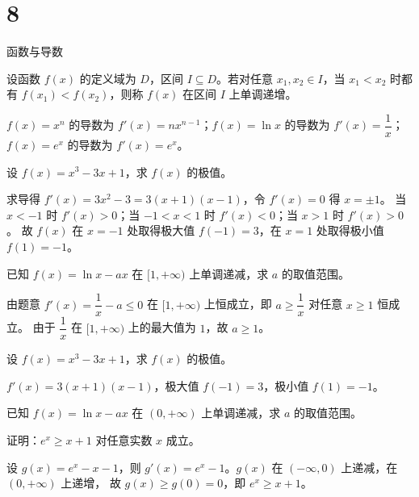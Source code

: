 \chapter{8}{函数与导数}


\begin{definition}[函数单调性]
设函数 $f(x)$ 的定义域为 $D$，区间 $I \subseteq D$。若对任意 $x_1, x_2 \in I$，当 $x_1 < x_2$ 时都有
$f(x_1) < f(x_2)$，则称 $f(x)$ 在区间 $I$ 上单调递增。
\end{definition}

\begin{theorem}[求导基本公式]
$f(x) = x^n$ 的导数为 $f'(x) = nx^{n-1}$；$f(x)=\ln x$ 的导数为 $f'(x)=\dfrac{1}{x}$；
$f(x)=e^x$ 的导数为 $f'(x)=e^x$。
\end{theorem}


\begin{example}[利用导数求极值]
设 $f(x)=x^3-3x+1$，求 $f(x)$ 的极值。
\end{example}

求导得 $f'(x)=3x^2-3=3(x+1)(x-1)$，令 $f'(x)=0$ 得 $x=\pm 1$。
当 $x<-1$ 时 $f'(x)>0$；当 $-1<x<1$ 时 $f'(x)<0$；当 $x>1$ 时 $f'(x)>0$。
故 $f(x)$ 在 $x=-1$ 处取得极大值 $f(-1)=3$，在 $x=1$ 处取得极小值 $f(1)=-1$。

\begin{example}[参数取值范围]
已知 $f(x)=\ln x-ax$ 在 $[1,+\infty)$ 上单调递减，求 $a$ 的取值范围。
\end{example}

由题意 $f'(x)=\dfrac{1}{x}-a\le 0$ 在 $[1,+\infty)$ 上恒成立，即 $a\ge \dfrac{1}{x}$ 对任意 $x\ge 1$ 恒成立。
由于 $\dfrac{1}{x}$ 在 $[1,+\infty)$ 上的最大值为 $1$，故 $a\ge 1$。


\begin{exercise}[求极值]
设 $f(x)=x^3-3x+1$，求 $f(x)$ 的极值。
\end{exercise}

\begin{solution}
$f'(x)=3(x+1)(x-1)$，极大值 $f(-1)=3$，极小值 $f(1)=-1$。
\end{solution}

\begin{exercise}[恒成立问题]
已知 $f(x)=\ln x-ax$ 在 $(0,+\infty)$ 上单调递减，求 $a$ 的取值范围。
\end{exercise}

\begin{exercise}[指数不等式]
证明：$e^x\ge x+1$ 对任意实数 $x$ 成立。
\end{exercise}

\begin{solution}
设 $g(x)=e^x-x-1$，则 $g'(x)=e^x-1$。$g(x)$ 在 $(-\infty,0)$ 上递减，在 $(0,+\infty)$ 上递增，
故 $g(x)\ge g(0)=0$，即 $e^x\ge x+1$。
\end{solution}
